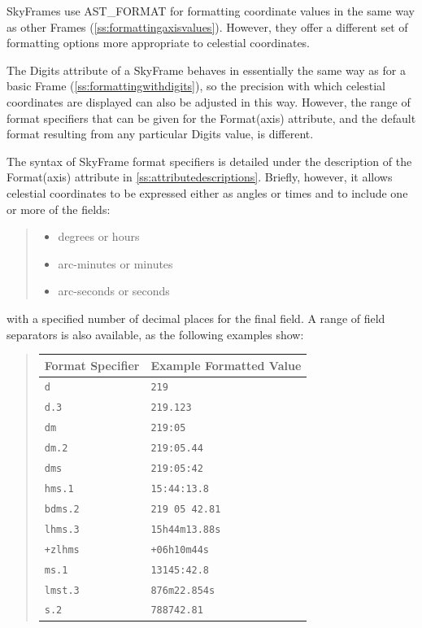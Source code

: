 \documentclass[twoside,11pt]{article}
\newcommand{\htmlref}[2]{#1}
\newcommand{\appref}[1]{Appendix~\ref{#1}}
\newcommand{\secref}[1]{\S\ref{#1}}
\renewcommand{\appref}[1]{\ref{#1}}
\renewcommand{\secref}[1]{\ref{#1}}
\begin{document}
SkyFrames use \htmlref{AST\_FORMAT}{AST_FORMAT} for formatting coordinate values in the same
way as other Frames (\secref{ss:formattingaxisvalues}). However, they
offer a different set of formatting options more appropriate to
celestial coordinates.

The Digits attribute of a \htmlref{SkyFrame}{SkyFrame} behaves in essentially the same way
as for a basic \htmlref{Frame}{Frame} (\secref{ss:formattingwithdigits}), so the
precision with which celestial coordinates are displayed can also be
adjusted in this way. However, the range of format specifiers that can
be given for the \htmlref{Format(axis)}{Formataxis} attribute, and the default format
resulting from any particular Digits value, is different.

The syntax of SkyFrame format specifiers is detailed under the
description of the Format(axis) attribute in
\appref{ss:attributedescriptions}.  Briefly, however, it allows
celestial coordinates to be expressed either as angles or times and to
include one or more of the fields:

\begin{quote}
\begin{itemize}
\item degrees or hours
\item arc-minutes or minutes
\item arc-seconds or seconds
\end{itemize}
\end{quote}

with a specified number of decimal places for the final field. A range
of field separators is also available, as the following examples show:

\begin{quote}
\begin{center}
\begin{tabular}{|l|l|}
\hline
{\bf{Format Specifier}} & {\bf{Example Formatted Value}}\\
\hline \hline
{\tt{d}} & {\tt{219}}\\
{\tt{d.3}} & {\tt{219.123}}\\
{\tt{dm}} & {\tt{219:05}}\\
{\tt{dm.2}} & {\tt{219:05.44}}\\
{\tt{dms}} & {\tt{219:05:42}}\\
{\tt{hms.1}} & {\tt{15:44:13.8}}\\
{\tt{bdms.2}} & {\tt{219 05 42.81}}\\
{\tt{lhms.3}} & {\tt{15h44m13.88s}}\\
{\tt{+zlhms}} & {\tt{+06h10m44s}}\\
{\tt{ms.1}} & {\tt{13145:42.8}}\\
{\tt{lmst.3}} & {\tt{876m22.854s}}\\
{\tt{s.2}} & {\tt{788742.81}}\\
\hline
\end{tabular}
\end{center}
\end{quote}
\end{document}
